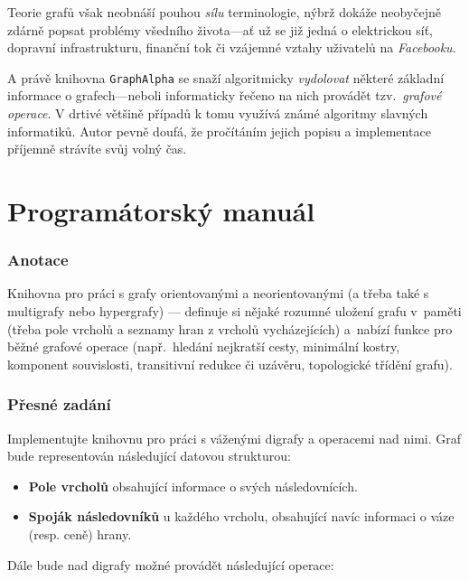 \documentclass[11pt,a4paper]{article}
\begin{document}
Teorie grafů však neobnáší pouhou {\sl sílu\/} terminologie, nýbrž dokáže
  neoby\-čejně zdárně popsat problémy všedního života---ať už se již jedná o
  elektrickou síť, dopravní infrastrukturu, finanční tok či vzájemné vztahy
  uživatelů na {\sl Facebooku\/}.

A právě knihovna {\tt GraphAlpha} se snaží algoritmicky {\sl vydolovat\/}
  některé základní informace o grafech---neboli informaticky řečeno na nich
  provádět tzv.~{\sl grafové operace\/}.
V drtivé většině případů k tomu využívá známé algoritmy slavných informatiků.
Autor pevně doufá, že pročítáním jejich popisu a implementace příjemně strávíte 
  svůj volný čas.

\pagebreak

\part{Programátorský manuál}
\section{Anotace}
Knihovna pro práci s grafy orientovanými a neorientovanými (a třeba také s
multigrafy nebo hypergrafy) --- definuje si nějaké rozumné uložení grafu
v~paměti (třeba pole vrcholů a seznamy hran z vrcholů vycházejících) a~nabízí
funkce pro běžné grafové operace (např.\ hledání nejkratší cesty, minimální
kostry, komponent souvislosti, transitivní redukce či uzávěru, topologické
třídění grafu). 

\section{Přesné zadání}
Implementujte knihovnu pro práci s váženými digrafy a operacemi nad nimi.
Graf bude representován následující datovou strukturou:

\renewcommand{\labelitemi}{$\spadesuit$}

\begin{itemize}
\item \textbf{Pole vrcholů} obsahující informace o svých následovnících.
\item \textbf{Spoják následovníků} u každého vrcholu, obsahující navíc
informaci o váze (resp. ceně) hrany.
\end{itemize}

Dále bude nad digrafy možné provádět následující operace:

\renewcommand{\labelitemi}{$\clubsuit$}
\end{document}

